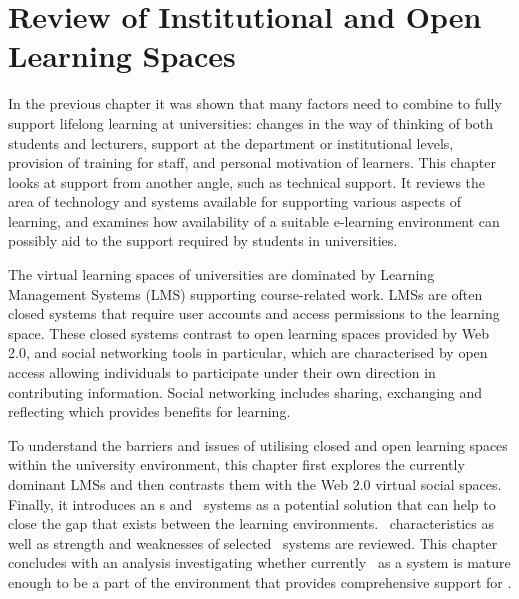 \chapter{Review of Institutional and Open Learning Spaces \label{cha:systudy}}

In the previous chapter it was shown that many factors need to combine to fully
support lifelong learning at universities: changes in the way of thinking of
both students and lecturers, support at the department or institutional levels,
provision of training for staff, and personal motivation of learners. This
chapter looks at \LLLs support from another angle, such as technical support. It
reviews the area of technology and systems available for supporting various
aspects of learning, and examines how availability of a suitable e-learning
environment can possibly aid to the \LLLs support required by students in
universities.

The virtual learning spaces of universities are dominated by Learning Management
Systems (LMS) supporting course-related work. LMSs are often closed systems that
require user accounts and access permissions to the learning space. These
closed systems contrast to open learning spaces provided by Web 2.0, and social
networking tools in particular, which are characterised by open access allowing
individuals to participate under their own direction in contributing
information. Social networking includes sharing, exchanging and reflecting which
provides benefits for learning. 
 
To understand the barriers and issues of utilising closed and open learning
spaces within the university environment, this chapter first explores the
currently dominant LMSs and then contrasts them with the Web 2.0 virtual social
spaces. Finally, it introduces an \ep s and \ep~systems as a potential solution
that can help to close the gap that exists between the learning environments.
\ep~characteristics as well as strength and weaknesses of selected \ep~systems
are reviewed. This chapter concludes with an analysis investigating whether
currently \ep~as a system is mature enough to be a part of the environment that
provides comprehensive support for \LLLsn.

